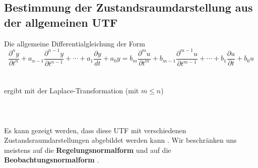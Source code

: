 \subsection{Bestimmung der Zustandsraumdarstellung aus der allgemeinen UTF}
Die  allgemeine Differentialgleichung der Form
\begin{equation*}
\frac{\partial^{n} y}{\partial t^{n}} + a_{n-1}\frac{\partial^{n-1} y}{\partial t^{n-1}} + \cdots +
a_{1}\frac{\partial y}{dt} + a_{0} y=
b_{m}\frac{\partial^{m} u}{\partial t^{m}} + b_{m-1}\frac{\partial^{m-1} u}{\partial t^{m-1}} + \cdots +
b_{1}\frac{\partial u}{\partial t} + b_{0} u
\end{equation*} \\~\\
ergibt mit der Laplace-Transformation (mit $m \leq n$) \\~\\
 \\~\\
Es kann gezeigt werden, dass diese UTF mit verschiedenen
Zustandsraumdarstellungen abgebildet werden kann \cite{GIR:RAB:STE:05,
  HSU:95, UNB:89}. Wir beschr\"anken uns meistens auf die {\bf
  Regelungsnormalform} und auf die {\bf
  Beobachtungsnormalform} \cite{UNB:89}.

